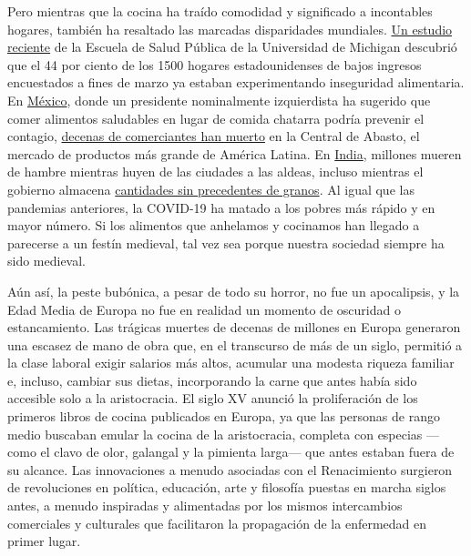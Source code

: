 Pero mientras que la cocina ha traído comodidad y significado a
incontables hogares, también ha resaltado las marcadas disparidades
mundiales.
\href{https://sph.umich.edu/news/2020posts/coronavirus-pandemic-worsens-food-insecurity-for-low-income-adults.html}{Un
estudio reciente} de la Escuela de Salud Pública de la Universidad de
Michigan descubrió que el 44 por ciento de los 1500 hogares
estadounidenses de bajos ingresos encuestados a fines de marzo ya
estaban experimentando inseguridad alimentaria. En
\href{https://www.nytimes.com/es/interactive/2020/espanol/america-latina/coronavirus-en-mexico.html}{México},
donde un presidente nominalmente izquierdista ha sugerido que comer
alimentos saludables en lugar de comida chatarra podría prevenir el
contagio,
\href{https://www.washingtonpost.com/world/2020/06/21/coronavirus-mexico-city-centro-abasto-market/?arc404=true}{decenas
de comerciantes han muerto} en la Central de Abasto, el mercado de
productos más grande de América Latina. En
\href{https://www.nytimes.com/interactive/2020/world/asia/india-coronavirus-cases.html}{India},
millones mueren de hambre mientras huyen de las ciudades a las aldeas,
incluso mientras el gobierno almacena
\href{https://www.bloomberg.com/news/articles/2020-03-24/india-has-enough-food-to-feed-poor-amid-prolonged-shutdown-fears}{cantidades
sin precedentes de granos}. Al igual que las pandemias anteriores, la
COVID-19 ha matado a los pobres más rápido y en mayor número. Si los
alimentos que anhelamos y cocinamos han llegado a parecerse a un festín
medieval, tal vez sea porque nuestra sociedad siempre ha sido medieval.

Aún así, la peste bubónica, a pesar de todo su horror, no fue un
apocalipsis, y la Edad Media de Europa no fue en realidad un momento de
oscuridad o estancamiento. Las trágicas muertes de decenas de millones
en Europa generaron una escasez de mano de obra que, en el transcurso de
más de un siglo, permitió a la clase laboral exigir salarios más altos,
acumular una modesta riqueza familiar e, incluso, cambiar sus dietas,
incorporando la carne que antes había sido accesible solo a la
aristocracia. El siglo XV anunció la proliferación de los primeros
libros de cocina publicados en Europa, ya que las personas de rango
medio buscaban emular la cocina de la aristocracia, completa con
especias ---como el clavo de olor, galangal y la pimienta larga--- que
antes estaban fuera de su alcance. Las innovaciones a menudo asociadas
con el Renacimiento surgieron de revoluciones en política, educación,
arte y filosofía puestas en marcha siglos antes, a menudo inspiradas y
alimentadas por los mismos intercambios comerciales y culturales que
facilitaron la propagación de la enfermedad en primer lugar.

